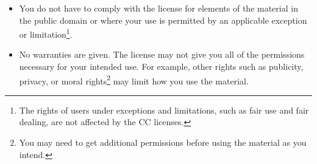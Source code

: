 \begin{itemize}
\item You do not have to comply with the license for elements of the material in the public domain or where your use is permitted by an applicable exception or limitation\footnote{The rights of users under exceptions and limitations, such as fair use and fair dealing, are not affected by the CC licenses.}.
\item No warranties are given. The license may not give you all of the permissions necessary for your intended use. For example, other rights such as publicity, privacy, or moral rights\footnote{You may need to get additional permissions before using the material as you intend.} may limit how you use the material.
\end{itemize}

